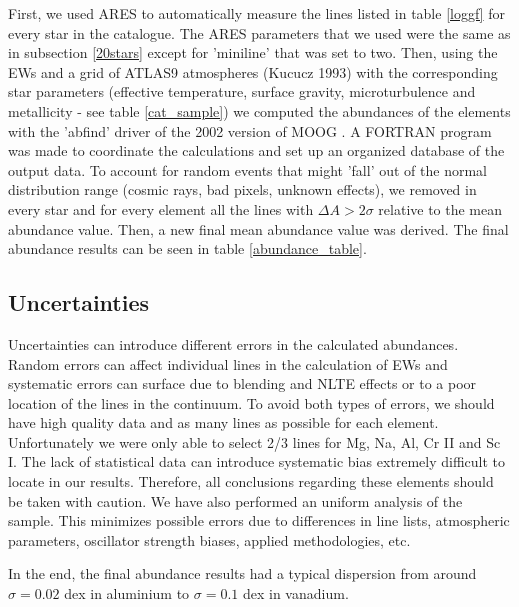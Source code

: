 \documentclass[dvips,12pt,a4paper]{report}
\begin{document}
{{First, we used ARES to automatically measure the lines listed in table \ref{loggf} for every star in the catalogue. The ARES parameters that we used were the same as in subsection \ref{20stars} except for 'miniline' that was set to two. Then, using the EWs and a grid of ATLAS9 atmospheres (Kucucz 1993) with the corresponding star parameters (effective temperature, surface gravity, microturbulence and metallicity - see table \ref{cat_sample}) we computed the abundances of the elements with the 'abfind' driver of the 2002 version of MOOG \citep{Sneden-1973}. A FORTRAN program was made to coordinate the calculations and set up an organized database of the output data. To account for random events that might 'fall' out of the normal distribution range (cosmic rays, bad pixels, unknown effects), we removed in every star and for every element all the lines with $\Delta A>2\sigma$ relative to the mean abundance value. Then, a new final mean abundance value was derived. The final abundance results can be seen in table \ref{abundance_table}. 

\subsection {Uncertainties}
\label{uncertain}
Uncertainties can introduce different errors in the calculated abundances. Random errors can affect individual lines in the calculation of EWs and systematic errors can surface due to blending and NLTE effects or to a poor location of the lines in the continuum. To avoid both types of errors, we should have high quality data and as many lines as possible for each element. Unfortunately we were only able to select 2/3 lines for Mg, Na, Al, Cr II and Sc I. The lack of statistical data can introduce systematic bias extremely difficult to locate in our results. Therefore, all conclusions regarding these elements should be taken with caution. We have also performed an uniform analysis of the sample. This minimizes possible errors due to differences in line lists, atmospheric parameters, oscillator strength biases, applied methodologies, etc. 

In the end, the final abundance results had a typical dispersion from around $\sigma=0.02$ dex in aluminium to $\sigma=0.1$ dex in vanadium.

}}
\end{document}
